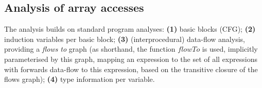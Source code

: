 \subsection{Analysis of array accesses}
\label{subsec:analysis}

\newcommand{\neigh}{\textsf{neigh}}

The analysis builds on standard program analyses:
%
\textbf{(1)} basic blocks (CFG);
\textbf{(2)} induction variables per basic block;
\textbf{(3)} (interprocedural) data-flow analysis, providing a \emph{flows to}
  graph (as shorthand, the function
  $\mathit{flowTo}$ is used, implicitly parameterised by this graph,
  mapping an expression to the set of all expressions
  with forwards data-flow to this expression, based on the transitive
  closure of the flows graph);
\textbf{(4)} type information per variable.%


